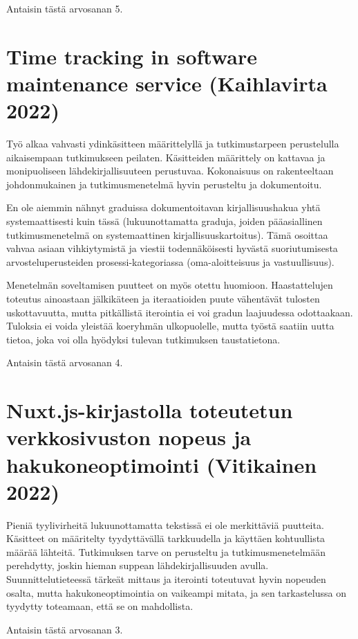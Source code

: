 \documentclass{article}
\begin{document}
Antaisin tästä arvosanan 5.

\section*{Time tracking in software maintenance service (Kaihlavirta 2022)}

Työ alkaa vahvasti ydinkäsitteen määrittelyllä ja tutkimustarpeen perustelulla
aikaisempaan tutkimukseen peilaten. Käsitteiden määrittely on kattavaa ja
monipuoliseen lähdekirjallisuuteen perustuvaa. Kokonaisuus on rakenteeltaan
johdonmukainen ja tutkimusmenetelmä hyvin perusteltu ja dokumentoitu.

En ole aiemmin nähnyt graduissa dokumentoitavan kirjallisuushakua yhtä
systemaattisesti kuin tässä (lukuunottamatta graduja, joiden pääasiallinen
tutkimusmenetelmä on systemaattinen kirjallisuuskartoitus). Tämä osoittaa
vahvaa asiaan vihkiytymistä ja viestii todennäköisesti hyvästä suoriutumisesta
arvosteluperusteiden prosessi-kategoriassa (oma-aloitteisuus ja vastuullisuus).

Menetelmän soveltamisen puutteet on myös otettu huomioon. Haastattelujen
toteutus ainoastaan jälkikäteen ja iteraatioiden puute vähentävät tulosten
uskottavuutta, mutta pitkällistä iterointia ei voi gradun laajuudessa
odottaakaan. Tuloksia ei voida yleistää koeryhmän ulkopuolelle, mutta
työstä saatiin uutta tietoa, joka voi olla hyödyksi tulevan tutkimuksen
taustatietona.

Antaisin tästä arvosanan 4.

\section*{Nuxt.js-kirjastolla toteutetun verkkosivuston nopeus ja
hakukone\-optimointi (Vitikainen 2022)}

Pieniä tyylivirheitä lukuunottamatta tekstissä ei ole merkittäviä puutteita.
Käsitteet on määritelty tyydyttävällä tarkkuudella ja käyttäen kohtuullista
määrää lähteitä. Tutkimuksen tarve on perusteltu ja tutkimusmenetelmään
perehdytty, joskin hieman suppean lähdekirjallisuuden avulla.
Suunnittelutieteessä tärkeät mittaus ja iterointi toteutuvat hyvin nopeuden
osalta, mutta hakukoneoptimointia on vaikeampi mitata, ja sen tarkastelussa on
tyydytty toteamaan, että se on mahdollista.

Antaisin tästä arvosanan 3.
\end{document}
